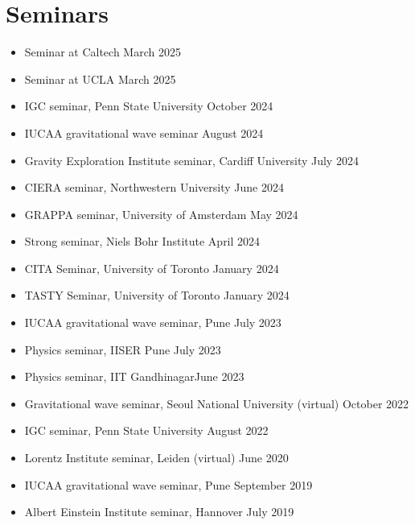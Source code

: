 		\section{Seminars}
		\begin{itemize}[leftmargin=*]


			\item Seminar at Caltech  \hfill March 2025
			\item Seminar at UCLA \hfill March 2025
			\item IGC seminar, Penn State University \hfill October 2024
			\item IUCAA gravitational wave seminar \hfill August 2024
			\item Gravity Exploration Institute seminar, Cardiff University \hfill July 2024 
			\item CIERA seminar, Northwestern University \hfill June 2024 
			\item GRAPPA seminar, University of Amsterdam \hfill May 2024 
			\item Strong seminar, Niels Bohr Institute \hfill April 2024 
			\item CITA Seminar, University of Toronto \hfill January 2024
			\item TASTY Seminar, University of Toronto \hfill January 2024
			\item IUCAA gravitational wave seminar, Pune \hfill July 2023
			\item Physics seminar, IISER Pune \hfill July 2023
			\item Physics seminar, IIT Gandhinagar\hfill June 2023
			\item Gravitational wave seminar, Seoul National University (virtual) \hfill October 2022 
			\item IGC seminar, Penn State University \hfill August 2022
			\item Lorentz Institute seminar, Leiden (virtual) \hfill June 2020
			\item IUCAA gravitational wave seminar, Pune \hfill September 2019
			\item Albert Einstein Institute seminar, Hannover \hfill July 2019
		\end{itemize}

